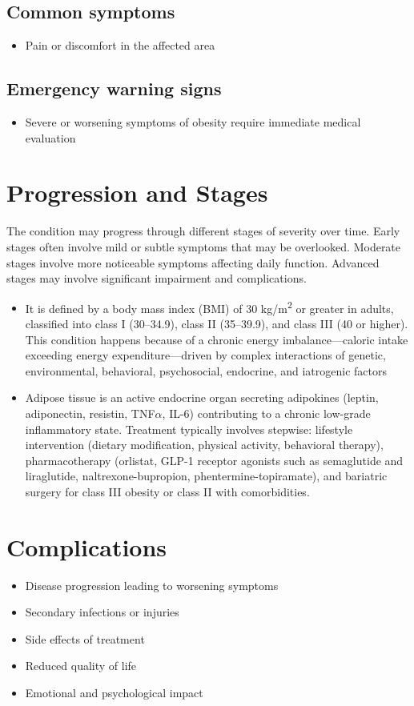 \subsection{Common symptoms}
\begin{itemize}[noitemsep]
  \item Pain or discomfort in the affected area
  \end{itemize}
\subsection{Emergency warning signs}
\begin{itemize}[noitemsep]
  \item Severe or worsening symptoms of obesity require immediate medical evaluation
\end{itemize}
\section{Progression and Stages}
The condition may progress through different stages of severity over time. Early stages often involve mild or subtle symptoms that may be overlooked. Moderate stages involve more noticeable symptoms affecting daily function. Advanced stages may involve significant impairment and complications.

\begin{itemize}[noitemsep]
  \item It is defined by a body mass index (BMI) of 30 kg/m\textsuperscript{2} or greater in adults, classified into class I (30--34.9), class II (35--39.9), and class III (40 or higher). This condition happens because of a chronic energy imbalance---caloric intake exceeding energy expenditure---driven by complex interactions of genetic, environmental, behavioral, psychosocial, endocrine, and iatrogenic factors
  \item Adipose tissue is an active endocrine organ secreting adipokines (leptin, adiponectin, resistin, TNF$\alpha$, IL-6) contributing to a chronic low-grade inflammatory state. Treatment typically involves stepwise: lifestyle intervention (dietary modification, physical activity, behavioral therapy), pharmacotherapy (orlistat, GLP-1 receptor agonists such as semaglutide and liraglutide, naltrexone-bupropion, phentermine-topiramate), and bariatric surgery for class III obesity or class II with comorbidities.
\end{itemize}
\section{Complications}
\begin{itemize}[noitemsep]
  \item Disease progression leading to worsening symptoms
  \item Secondary infections or injuries
  \item Side effects of treatment
  \item Reduced quality of life
  \item Emotional and psychological impact
\end{itemize}
